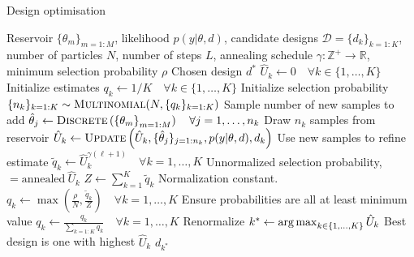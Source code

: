 \begin{algorithm}[t]
	\small
	\captionsetup{labelfont=bf, justification=justified,singlelinecheck=false}
	\caption{Design optimisation \label{alg:des-opt}}
	\begin{algorithmic}[1]
		\renewcommand{\algorithmicrequire}{\textbf{Inputs:}}
		\renewcommand{\algorithmicensure}{\textbf{Outputs:}}				 
		\Require Reservoir $\{\theta_m\}_{m=1:M}$, likelihood $p(y | \theta, d)$,
		candidate designs $\mathcal{D} = \{d_k\}_{k=1:K}$, number of particles $N$, number of steps
		$L$, annealing schedule $\gamma : \mathbb{Z}^+ \rightarrow \mathbb{R}$, minimum selection probability $\rho$
		\Ensure Chosen design $d^*$
		\State $\hat{U}_k \leftarrow 0 \quad \forall k \in \{1,\dots,K\}$ \Comment Initialize estimates
		\State $q_k \leftarrow 1/K \quad \forall k \in \{1,\dots,K\}$ \Comment Initialize selection probability
		\State $\{n_k\}_{k=1:K} \sim \textsc{Multinomial}(N,\{q_k\}_{k=1:K})$ \label{line:des-opt:sample-nsamples}
		\Comment Sample number of new samples to add\footnotemark
		\State $\hat{\theta}_{j} \leftarrow \textsc{Discrete}\left(\left\{\theta_m\right\}_{m=1:M}\right) \quad \forall j=1,\dots,n_k$ \label{line:des-opt:draw-theta}
		\Comment Draw $n_k$ samples from reservoir
		\State $\hat{U}_k \leftarrow \textsc{Update}\left(\hat{U}_k,\{\hat{\theta}_j\}_{j=1:n_k},p(y | \theta, d),d_k\right)$
		\label{line:des-opt:refine-U}
		\Comment Use new samples to refine estimate %
		\EndFor	
		\State $\tilde{q}_k \leftarrow \hat{U}_k^{\gamma(\ell+1)} \quad \forall k = 1,\dots,K$ 
		\label{line:des-opt:set-p}
		\Comment Unnormalized selection probability, $=\text{annealed} ~\hat{U}_k$
		\State $Z \leftarrow \sum_{k=1}^{K} \tilde{q}_k $ \Comment Normalization constant.
		\State $q_k \leftarrow \max\left(\frac{\rho}{N},\frac{\tilde{q}_k }{Z}\right) \quad \forall k = 1,\dots,K$ \Comment Ensure probabilities are all at least minimum value
		\State $q_k \leftarrow \frac{q_k}{\sum_{k=1:K} q_k} \quad \forall k = 1,\dots,K$ 
		\label{line:des-opt:renorm}
		\Comment Renormalize
		\EndFor	
		\State $k^* \leftarrow \operatorname*{arg\,max}_{k \in \{1,\dots,K\}} \hat{U}_k$ \Comment Best design is one with highest $\hat{U}_k$
		\State \Return $d_{k^*}$
	\end{algorithmic}
\end{algorithm}

